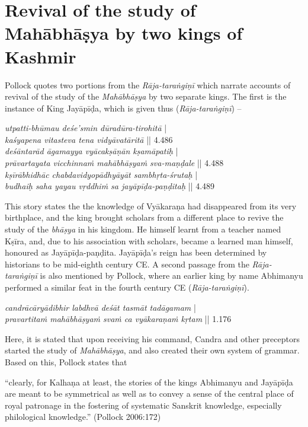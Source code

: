 \section{Revival of the study of Mahābhāṣya by two kings of Kashmir}\label{chap3-sec12}

Pollock quotes two portions from the {\sl Rāja-taraṅgiṇī} which narrate accounts of revival of the study of the {\sl Mahābhāṣya} by two separate kings. The first is the instance of King Jayāpīḍa,  which is given thus ({\sl Rāja-taraṅgiṇī}) --
\begin{myquote}
{{\sl utpatti-bhūmau deśe’smin dūradūra-tirohitā}} |\\
{{\sl kaśyapena vitasteva tena vidyāvatāritā}} || 4.486\\
{{\sl deśāntarād āgamayya vyācakṣāṇān kṣamāpatiḥ}} |\\ 
{{\sl prāvartayata vicchinnaṁ mahābhāṣyaṁ sva-maṇḍale}} || 4.488\\
{{\sl kṣīrābhidhāc chabdavidyopādhyāyāt sambhṛta-śrutaḥ}} |\\
{{\sl budhaiḥ saha yayau vṛddhiṁ sa jayāpīḍa-paṇḍitaḥ}} || 4.489  
\end{myquote}
This story states the the knowledge of Vyākaraṇa had disappeared from its very birthplace, and the king brought scholars from a different place to revive the study of the {\sl bhāṣya} in his kingdom. He himself learnt from a teacher named Kṣīra, and, due to his association with scholars, became a learned man himself, honoured as Jayāpīḍa-paṇḍita. Jayāpīḍa's reign has been determined by historians to be mid-eighth century CE. A second passage from the {\sl Rāja-taraṅgiṇī} is also mentioned by Pollock, where an earlier king by name Abhimanyu performed a similar feat in the fourth century CE ({\sl Rāja-taraṅgiṇī}).
\begin{myquote}
{{\sl candrācāryādibhir labdhvā deśāt tasmāt tadāgamam}} |\\ 
{{\sl pravartitaṁ mahābhāṣyaṁ svaṁ ca vyākaraṇaṁ kṛtam}} || 1.176
\end{myquote}
Here, it is stated that upon receiving his command, Candra and other preceptors started the study of {\sl Mahābhāṣya}, and also created their own system of grammar. Based on this, Pollock states that 
\begin{myquote}
``clearly, for Kalhaṇa  at least, the stories of the kings Abhimanyu and Jayāpīḍa are meant to be symmetrical as well as to convey a sense of the central place of royal patronage in the fostering of systematic Sanskrit knowledge, especially philological knowledge.''
\hfill (Pollock 2006:172)
\end{myquote}
